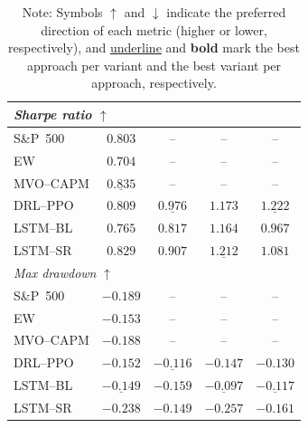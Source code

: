 \begin{table}[ht]
\begin{tabular}{|l | c c c c|}
\hline\hline
\multicolumn{5}{|l|}{\textit{Sharpe ratio} $\uparrow$} \\
\hline
S\&P~500      & $0.803$                      & --                          & --                               & --      \\
EW              & $0.704$                      & --                          & --                               & --      \\
MVO--CAPM       & $\underline{0.835}$          & --                          & --                               & --      \\
DRL--PPO        & $0.809$                      & $\underline{0.976}$         & $1.173$                          & $\underline{\mathbf{1.222}}$ \\
LSTM--BL        & $0.765$                      & $0.817$                     & $\mathbf{1.164}$                 & $0.967$ \\
LSTM--SR        & $0.829$                      & $0.907$                     & $\underline{\mathbf{1.212}}$     & $1.081$ \\
\hline\hline
\multicolumn{5}{|l|}{\textit{Max drawdown} $\uparrow$} \\
\hline
S\&P~500      & $-0.189$                     & --                          & --                               & --       \\
EW              & $-0.153$                     & --                          & --                               & --       \\
MVO--CAPM       & $-0.188$                     & --                          & --                               & --       \\
DRL--PPO        & $-0.152$                     & $\underline{\mathbf{-0.116}}$ & $-0.147$                       & $-0.130$ \\
LSTM--BL        & $\underline{-0.149}$         & $-0.159$                    & $\underline{\mathbf{-0.097}}$    & $\underline{-0.117}$ \\
LSTM--SR        & $-0.238$                     & $\mathbf{-0.149}$           & $-0.257$                         & $-0.161$ \\
\hline
\end{tabular}
\caption*{\footnotesize
Note: Symbols $\uparrow$ and $\downarrow$ indicate the preferred direction of each metric (higher or lower, respectively), and \underline{underline} and \textbf{bold} mark the best approach per variant and the best variant per approach, respectively.
}
\end{table}


